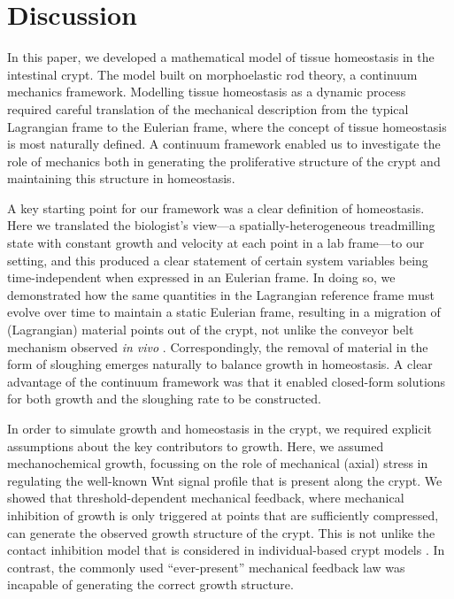 \section{Discussion}
\label{sec:discussion}
In this paper, we developed a mathematical model of tissue homeostasis in the intestinal crypt. The model built on morphoelastic rod theory, a continuum mechanics framework. %
Modelling tissue homeostasis as a dynamic process required careful translation of the mechanical description from the typical Lagrangian frame to the Eulerian frame, where the concept of tissue homeostasis is most naturally defined. A continuum framework enabled us to investigate the role of mechanics both in generating the proliferative structure of the crypt and maintaining this structure in homeostasis.

A key starting point for our framework was a clear definition of homeostasis. Here we translated the biologist's view---a spatially-heterogeneous treadmilling state with constant growth and velocity at each point in a lab frame---to our setting, and this produced a clear statement of certain system variables being time-independent when expressed in an Eulerian frame. 
In doing so, we demonstrated how the same quantities in the Lagrangian reference frame must evolve over time to maintain a static Eulerian frame, resulting in a migration of (Lagrangian) material points out of the crypt, not unlike the conveyor belt mechanism observed \emph{in vivo} \cite{krndija2019active}. Correspondingly, the removal of material in the form of sloughing emerges naturally to balance growth in homeostasis. A clear advantage of the continuum framework was that it enabled closed-form solutions for both growth and the sloughing rate to be constructed.

In order to simulate growth and homeostasis in the crypt, we required explicit assumptions about the key contributors to growth. Here, we assumed mechanochemical growth, focussing on the role of mechanical (axial) stress in regulating the well-known Wnt signal profile that is present along the crypt. We showed that threshold-dependent mechanical feedback, where mechanical inhibition of growth is only triggered at points that are sufficiently compressed, can generate the observed growth structure of the crypt. This is not unlike the contact inhibition model that is considered in individual-based crypt models \cite{Osborne2017}. In contrast, the commonly used ``ever-present'' mechanical feedback law was incapable of generating the correct growth structure. 

